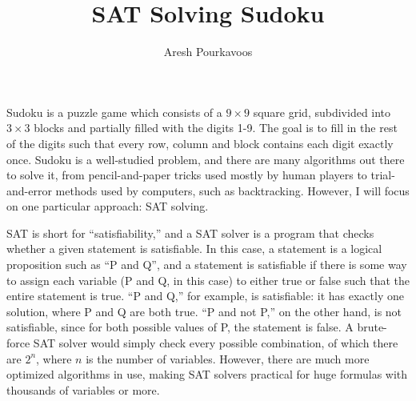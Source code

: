 \documentclass{article}
\begin{document}
\title{SAT Solving Sudoku}
\author{Aresh Pourkavoos}
\maketitle

Sudoku is a puzzle game which consists of a $9 \times 9$ square grid,
subdivided into $3 \times 3$ blocks
and partially filled with the digits 1-9.
The goal is to fill in the rest of the digits such that
every row, column and block contains each digit exactly once.
Sudoku is a well-studied problem,
and there are many algorithms out there to solve it,
from pencil-and-paper tricks used mostly by human players
to trial-and-error methods used by computers, such as backtracking.
However, I will focus on one particular approach: SAT solving.

SAT is short for ``satisfiability,''
and a SAT solver is a program that checks
whether a given statement is satisfiable.
In this case, a statement is a logical proposition
such as ``P and Q'',
and a statement is satisfiable
if there is some way to assign each variable
(P and Q, in this case) to either true or false
such that the entire statement is true.
``P and Q,'' for example, is satisfiable:
it has exactly one solution, where P and Q are both true.
``P and not P,'' on the other hand, is not satisfiable,
since for both possible values of P, the statement is false.
A brute-force SAT solver would simply check every possible combination,
of which there are $2^n$, where $n$ is the number of variables.
However, there are much more optimized algorithms in use,
making SAT solvers practical for huge formulas with thousands of variables or more.

\end{document}
